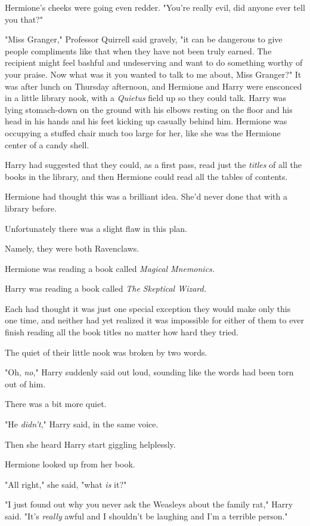Hermione's cheeks were going even redder. "You're really evil, did anyone ever
tell you that?"

"Miss Granger," Professor Quirrell said gravely, "it can be dangerous to give
people compliments like that when they have not been truly earned. The
recipient might feel bashful and undeserving and want to do something worthy of
your praise. Now what was it you wanted to talk to me about, Miss Granger?"
\sbreak
It was after lunch on Thursday afternoon, and Hermione and Harry were ensconced
in a little library nook, with a \emph{Quietus} field up so they could talk.
Harry was lying stomach-down on the ground with his elbows resting on the floor
and his head in his hands and his feet kicking up casually behind him. Hermione
was occupying a stuffed chair much too large for her, like she was the Hermione
center of a candy shell.

Harry had suggested that they could, as a first pass, read just the
\emph{titles} of all the books in the library, and then Hermione could read all
the tables of contents.

Hermione had thought this was a brilliant idea. She'd never done that with a
library before.

Unfortunately there was a slight flaw in this plan.

Namely, they were both Ravenclaws.

Hermione was reading a book called \emph{Magical Mnemonics.}

Harry was reading a book called \emph{The Skeptical Wizard.}

Each had thought it was just one special exception they would make only this
one time, and neither had yet realized it was impossible for either of them to
ever finish reading all the book titles no matter how hard they tried.

The quiet of their little nook was broken by two words.

"Oh, \emph{no}," Harry suddenly said out loud, sounding like the words had been
torn out of him.

There was a bit more quiet.

"He \emph{didn't}," Harry said, in the same voice.

Then she heard Harry start giggling helplessly.

Hermione looked up from her book.

"All right," she said, "what \emph{is} it?"

"I just found out why you never ask the Weasleys about the family rat," Harry
said. "It's \emph{really} awful and I shouldn't be laughing and I'm a terrible
person."

